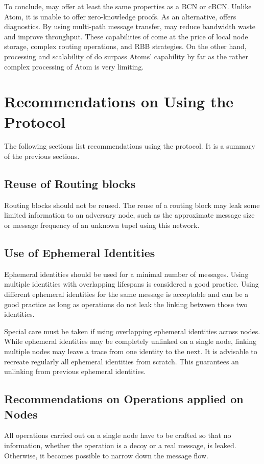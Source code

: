 To conclude, \MessageVortex{} may offer at least the same properties as a BCN or cBCN. Unlike Atom, it is unable to offer zero-knowledge proofs. As an alternative, \MessageVortex{} offers diagnostics. By using multi-path message transfer, \MessageVortex{} may reduce bandwidth waste and improve throughput. These capabilities of \MessageVortex{} come at the price of local node storage, complex routing operations, and RBB strategies. On the other hand, processing and scalability of \MessageVortex{} do surpass Atoms' capability by far as the rather complex processing of Atom is very limiting.

\chapter{Recommendations on Using the \MessageVortex{} Protocol}
The following sections list recommendations using the \MessageVortex{} protocol. It is a summary of the previous sections.

\section{Reuse of Routing blocks\label{sec:reuseRB}}
Routing blocks should not be reused. The reuse of a routing block may leak some limited information to an adversary node, such as the approximate message size or message frequency of an unknown tupel using this network.

\section{Use of Ephemeral Identities}
Ephemeral identities should be used for a minimal number of messages. Using multiple identities with overlapping lifespans is considered a good practice. Using different ephemeral identities for the same message is acceptable and can be a good practice as long as operations do not leak the linking between those two identities.

Special care must be taken if using overlapping ephemeral identities across nodes. While ephemeral identities may be completely unlinked on a single node, linking multiple nodes may leave a trace from one identity to the next. It is advisable to recreate regularly all ephemeral identities from scratch. This guarantees an unlinking from previous ephemeral identities.

\section{Recommendations on Operations applied on Nodes}
All operations carried out on a single node have to be crafted so that no information, whether the operation is a decoy or a real message, is leaked. Otherwise, it becomes possible to narrow down the message flow.


